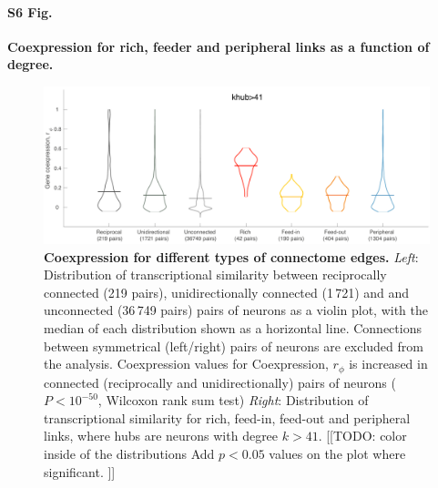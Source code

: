 \documentclass[10pt,letterpaper]{article}
\begin{document}
\paragraph*{S6 Fig.}
{\bf Coexpression for rich, feeder and peripheral links as a function of degree.}
\begin{figure}[!h]
\label{RFPdistributions}
\centering
    \includegraphics[width=1\textwidth]{Distributions.pdf}
    \caption{
\textbf{Coexpression for different types of connectome edges.}
\emph{Left}: Distribution of transcriptional similarity between reciprocally connected (219 pairs), unidirectionally connected (1\,721) and  and unconnected (36\,749 pairs) pairs of neurons as a violin plot, with the median of each distribution shown as a horizontal line.
Connections between symmetrical (left/right) pairs of neurons are excluded from the analysis. Coexpression values for 
Coexpression, $r_\phi$ is increased in connected (reciprocally and unidirectionally) pairs of neurons ($P < 10^{-50}$, Wilcoxon rank sum test)
\emph{Right}: Distribution of transcriptional similarity for rich, feed-in, feed-out and peripheral links, where hubs are neurons with degree $k>41$.
[[TODO: color inside of the distributions
Add $p<0.05$ values on the plot where significant.
]]
}
\end{figure}

\end{document}
